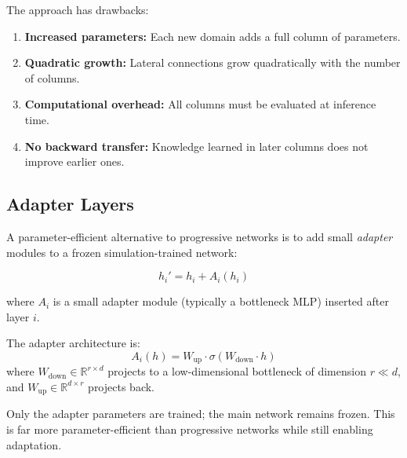 The approach has drawbacks:

\begin{enumerate}
    \item \textbf{Increased parameters:} Each new domain adds a full column of parameters.

    \item \textbf{Quadratic growth:} Lateral connections grow quadratically with the number of columns.

    \item \textbf{Computational overhead:} All columns must be evaluated at inference time.

    \item \textbf{No backward transfer:} Knowledge learned in later columns does not improve earlier ones.
\end{enumerate}

\subsection{Adapter Layers}

A parameter-efficient alternative to progressive networks is to add small \textit{adapter} modules to a frozen simulation-trained network:

\begin{equation}
h_i' = h_i + A_i(h_i)
\label{eq:adapter}
\end{equation}

where $A_i$ is a small adapter module (typically a bottleneck MLP) inserted after layer $i$.

The adapter architecture is:
\begin{equation}
A_i(h) = W_{\text{up}} \cdot \sigma(W_{\text{down}} \cdot h)
\end{equation}
where $W_{\text{down}} \in \mathbb{R}^{r \times d}$ projects to a low-dimensional bottleneck of dimension $r \ll d$, and $W_{\text{up}} \in \mathbb{R}^{d \times r}$ projects back.

Only the adapter parameters are trained; the main network remains frozen. This is far more parameter-efficient than progressive networks while still enabling adaptation.

